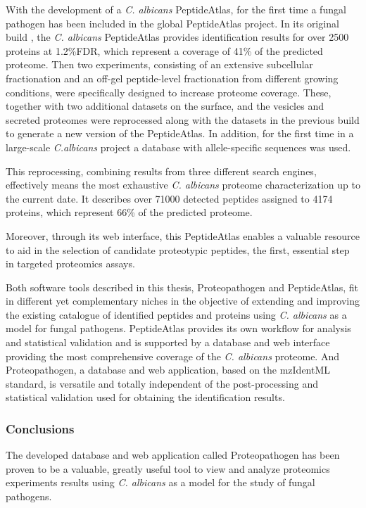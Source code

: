 With the development of a \textit{C. albicans} PeptideAtlas, for the
first time a fungal pathogen has been included in the global PeptideAtlas project.
In its original build \citep{Vialas2013}, the \textit{C. albicans} PeptideAtlas provides identification
results for over 2500 proteins at 1.2\%FDR, which represent a coverage of 41\% of
the predicted proteome. Then two 
experiments, consisting of an extensive subcellular fractionation and an off-gel
peptide-level fractionation from different growing conditions, were specifically
designed to increase proteome coverage. These, together with two additional datasets
on the surface, and the vesicles and secreted proteomes were reprocessed along with
the datasets in the previous build to generate a new version of the PeptideAtlas.
In addition, for the first time in a large-scale \textit{C.albicans} project
a database with allele-specific sequences was used. 

This reprocessing, combining results from three different search engines,
effectively means the most exhaustive \textit{C. albicans}
proteome characterization up to the current date.
It describes over 71000 detected peptides assigned to 4174 proteins, which
represent 66\% of the predicted proteome. 

Moreover, through its web interface, this PeptideAtlas enables a valuable
resource to aid in the selection of candidate proteotypic peptides, the
first, essential step in targeted proteomics assays.

Both software tools described in this thesis, Proteopathogen and PeptideAtlas,
fit in different yet complementary niches in the objective of extending and improving
the existing catalogue of identified peptides and proteins using \textit{C. albicans} 
as a model for fungal pathogens. PeptideAtlas provides its own workflow for analysis
and statistical validation and is supported by a database and web interface providing
the most comprehensive coverage of the \textit{C. albicans} proteome. And Proteopathogen, a database 
and web application, based on the mzIdentML standard, is versatile and totally independent
of the post-processing and statistical validation used for obtaining the identification results.


\subsubsection*{Conclusions}

The developed database and web application called Proteopathogen has been proven to be a
valuable, greatly useful tool to view and analyze proteomics experiments 
results using \textit{C. albicans} as a model for the study of fungal pathogens.

